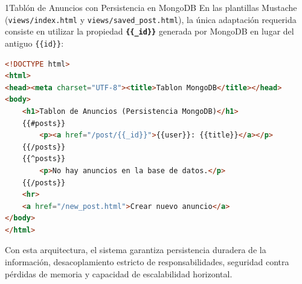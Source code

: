 \begin{ejercicioresuelto}{1}{Tablón de Anuncios con Persistencia en MongoDB}
En las plantillas Mustache (\texttt{views/index.html} y \texttt{views/saved\_post.html}), la única adaptación requerida consiste en utilizar la propiedad \textbf{\texttt{\{\{\_id\}\}}} generada por MongoDB en lugar del antiguo \texttt{\{\{id\}\}}:
\begin{lstlisting}[language=html, caption={views/index.html adaptado a MongoDB}]
<!DOCTYPE html>
<html>
<head><meta charset="UTF-8"><title>Tablon MongoDB</title></head>
<body>
    <h1>Tablon de Anuncios (Persistencia MongoDB)</h1>
    {{#posts}}
        <p><a href="/post/{{_id}}">{{user}}: {{title}}</a></p>
    {{/posts}}
    {{^posts}}
        <p>No hay anuncios en la base de datos.</p>
    {{/posts}}
    <hr>
    <a href="/new_post.html">Crear nuevo anuncio</a>
</body>
</html>
\end{lstlisting}
Con esta arquitectura, el sistema garantiza persistencia duradera de la información, desacoplamiento estricto de responsabilidades, seguridad contra pérdidas de memoria y capacidad de escalabilidad horizontal.
\end{ejercicioresuelto}
